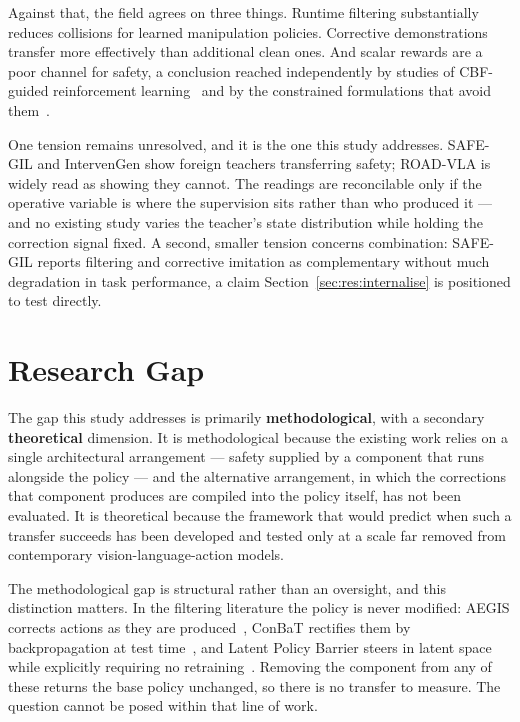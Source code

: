 \documentclass[a4paper,11pt]{report}
\begin{document}
Against that, the field agrees on three things. Runtime filtering substantially reduces collisions
for learned manipulation policies. Corrective demonstrations transfer more effectively than
additional clean ones. And scalar rewards are a poor channel for safety, a conclusion reached
independently by studies of CBF-guided reinforcement
learning~\cite{guerrier2025guardrails} and by the constrained formulations that avoid
them~\cite{safevla,safedojo}.

One tension remains unresolved, and it is the one this study addresses. SAFE-GIL and IntervenGen
show foreign teachers transferring safety; ROAD-VLA is widely read as showing they cannot. The
readings are reconcilable only if the operative variable is where the supervision sits rather than
who produced it --- and no existing study varies the teacher's state distribution while holding the
correction signal fixed. A second, smaller tension concerns combination: SAFE-GIL reports filtering
and corrective imitation as complementary without much degradation in task performance, a claim
Section~\ref{sec:res:internalise} is positioned to test directly.

\section{Research Gap}\label{sec:bg:gap}

The gap this study addresses is primarily \textbf{methodological}, with a secondary
\textbf{theoretical} dimension. It is methodological because the existing work relies on a single
architectural arrangement --- safety supplied by a component that runs alongside the policy --- and
the alternative arrangement, in which the corrections that component produces are compiled into the
policy itself, has not been evaluated. It is theoretical because the framework that would predict
when such a transfer succeeds has been developed and tested only at a scale far removed from
contemporary vision-language-action models.

The methodological gap is structural rather than an oversight, and this distinction matters. In the
filtering literature the policy is never modified: AEGIS corrects actions as they are
produced~\cite{vlsa2026}, ConBaT rectifies them by backpropagation at test
time~\cite{meng2024conbat}, and Latent Policy Barrier steers in latent space while explicitly
requiring no retraining~\cite{sun2025lpb}. Removing the component from any of these returns the
base policy unchanged, so there is no transfer to measure. The question cannot be posed within that
line of work.
\end{document}
